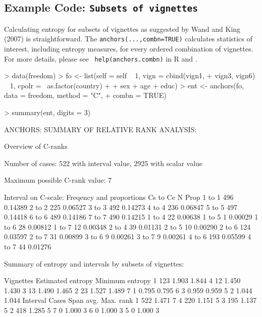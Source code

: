 \documentclass{amsart}
\newcommand{\code}[1]{{\texttt{#1}}}
\begin{document}
\subsection{Example Code: \texttt{Subsets of vignettes}}

Calculating entropy for subsets of vignettes as suggested by Wand and
King (2007) is straightforward.  The \code{anchors(...,combn=TRUE)}
calculates statistics of interest, including entropy measures, for
every ordered combination of vignettes.  For more details, please see {\tt
help(anchors.combn)} in R and \cite{king.wand:2007}.
\begin{Schunk}
\begin{Sinput}
> data(freedom)
> fo <- list(self = self ~ 1, vign = cbind(vign1, 
+     vign3, vign6) ~ 1, cpolr = ~as.factor(country) + 
+     sex + age + educ)
> ent <- anchors(fo, data = freedom, method = "C", 
+     combn = TRUE)
\end{Sinput}
\end{Schunk}
\begin{Schunk}
\begin{Sinput}
> summary(ent, digits = 3)
\end{Sinput}
\begin{Soutput}
ANCHORS: SUMMARY OF RELATIVE RANK ANALYSIS:

Overview of C-ranks

Number of cases: 522 with interval value, 2925 with scalar value

Maximum possible C-rank value: 7

Interval on C-scale: Freqency and proportions Cs to Ce
           N    Prop
 1 to  1 496 0.14389
 2 to  2 225 0.06527
 3 to  3 492 0.14273
 4 to  4 236 0.06847
 5 to  5 497 0.14418
 6 to  6 489 0.14186
 7 to  7 490 0.14215
 1 to  4  22 0.00638
 1 to  5   1 0.00029
 1 to  6  28 0.00812
 1 to  7  12 0.00348
 2 to  4  39 0.01131
 2 to  5  10 0.00290
 2 to  6 124 0.03597
 2 to  7  31 0.00899
 3 to  6   9 0.00261
 3 to  7   9 0.00261
 4 to  6 193 0.05599
 4 to  7  44 0.01276


Summary of entropy and intervals by subsets of vignettes:

  Vignettes Estimated entropy Minimum entropy
1       123             1.903           1.844
4        12             1.450           1.430
3        13             1.490           1.465
2        23             1.527           1.489
7         1             0.795           0.795
6         3             0.959           0.959
5         2             1.044           1.044
  Interval Cases Span avg. Max. rank
1            522     1.471         7
4            220     1.151         5
3            195     1.137         5
2            418     1.285         5
7              0     1.000         3
6              0     1.000         3
5              0     1.000         3
\end{Soutput}
\end{Schunk}
\end{document}

